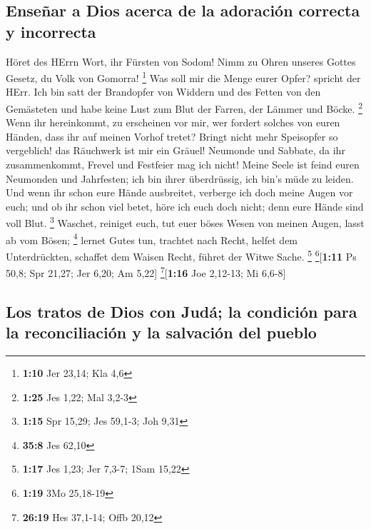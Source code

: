 \hypertarget{enseuxf1ar-a-dios-acerca-de-la-adoraciuxf3n-correcta-y-incorrecta}{%
\subsection{Enseñar a Dios acerca de la adoración correcta y
incorrecta}\label{enseuxf1ar-a-dios-acerca-de-la-adoraciuxf3n-correcta-y-incorrecta}}

 Höret des HErrn Wort, ihr Fürsten von Sodom! Nimm zu
Ohren unseres Gottes Gesetz, du Volk von Gomorra! \footnote{\textbf{1:10}
  Jer 23,14; Kla 4,6}  Was soll mir die Menge eurer
Opfer? spricht der HErr. Ich bin satt der Brandopfer von Widdern und des
Fetten von den Gemästeten und habe keine Lust zum Blut der Farren, der
Lämmer und Böcke. \footnote{\textbf{1:25} Jes 1,22; Mal 3,2-3}
 Wenn ihr hereinkommt, zu erscheinen vor mir, wer fordert
solches von euren Händen, dass ihr auf meinen Vorhof tretet?
 Bringt nicht mehr Speisopfer so vergeblich! das
Räuchwerk ist mir ein Gräuel! Neumonde und Sabbate, da ihr
zusammenkommt, Frevel und Festfeier mag ich nicht!  Meine
Seele ist feind euren Neumonden und Jahrfesten; ich bin ihrer
überdrüssig, ich bin's müde zu leiden.  Und wenn ihr
schon eure Hände ausbreitet, verberge ich doch meine Augen vor euch; und
ob ihr schon viel betet, höre ich euch doch nicht; denn eure Hände sind
voll Blut. \footnote{\textbf{1:15} Spr 15,29; Jes 59,1-3; Joh 9,31}
 Waschet, reiniget euch, tut euer böses Wesen von meinen
Augen, lasst ab vom Bösen; \footnote{\textbf{35:8} Jes 62,10}
 lernet Gutes tun, trachtet nach Recht, helfet dem
Unterdrückten, schaffet dem Waisen Recht, führet der Witwe Sache.
\footnote{\textbf{1:17} Jes 1,23; Jer 7,3-7; 1Sam 15,22}
\footnote{\textbf{1:19} 3Mo 25,18-19}{[}\textbf{1:11} Ps 50,8; Spr
21,27; Jer 6,20; Am 5,22{]} \footnote{\textbf{26:19} Hes 37,1-14; Offb
  20,12}{[}\textbf{1:16} Joe 2,12-13; Mi 6,6-8{]}

\hypertarget{los-tratos-de-dios-con-juduxe1-la-condiciuxf3n-para-la-reconciliaciuxf3n-y-la-salvaciuxf3n-del-pueblo}{%
\subsection{Los tratos de Dios con Judá; la condición para la
reconciliación y la salvación del
pueblo}\label{los-tratos-de-dios-con-juduxe1-la-condiciuxf3n-para-la-reconciliaciuxf3n-y-la-salvaciuxf3n-del-pueblo}}


